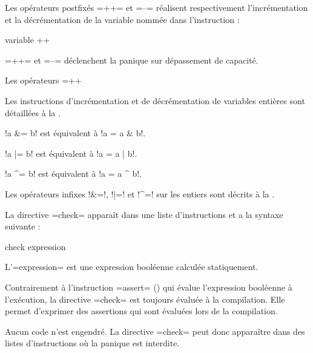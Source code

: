 
Les opérateurs postfixés \plm=++= et \plm=--= réalisent respectivement l'incrémentation et la décrémentation de la variable nommée dans l'instruction :
\begin{PLM}
variable ++
\end{PLM}

\plm=++= et \plm=--= déclenchent la panique sur dépassement de capacité.

Les opérateurs \plm=++%

Les instructions d'incrémentation et de décrémentation de variables entières sont détaillées à la .






\index{\&=}
\index{\textbar=}
\index{\^{}=}

\plm!a &= b! est équivalent à \plm!a = a & b!.

\plm!a |= b! est équivalent à \plm!a = a | b!.

\plm!a ^= b! est équivalent à \plm!a = a ^ b!.

Les opérateurs infixes \plm!&=!, \plm!|=! et \plm!^=! sur les entiers sont décrits à la .



La directive \plm=check= apparaît dans une liste d'instructions et a la syntaxe suivante :
\begin{PLM}
check expression
\end{PLM}

L'\plm=expression= est une expression booléenne calculée statiquement.

Contrairement à l'instruction \plm=assert= () qui évalue l'expression booléenne à l'exécution, la directive \plm=check= est toujours évaluée à la compilation. Elle permet d'exprimer des assertions qui sont évaluées lors de la compilation.

Aucun code n'est engendré. La directive \plm=check= peut donc apparaître dans des listes d'instructions où la panique est interdite.

